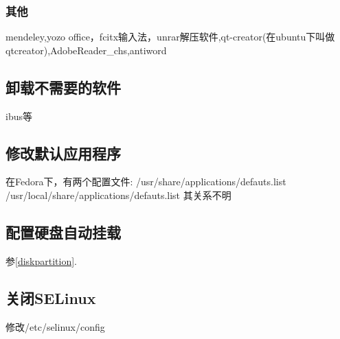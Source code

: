 \subsubsection{其他}
mendeley,yozo office，fcitx输入法，unrar解压软件,qt-creator(在ubuntu下叫做qtcreator),AdobeReader\_chs,antiword

\subsection{卸载不需要的软件}
ibus等

\subsection{修改默认应用程序}
在Fedora下，有两个配置文件:
/usr/share/applications/defauts.list \\
/usr/local/share/applications/defauts.list
其关系不明

\subsection{配置硬盘自动挂载}
参\ref{diskpartition}.

\subsection{关闭SELinux}
修改/etc/selinux/config




